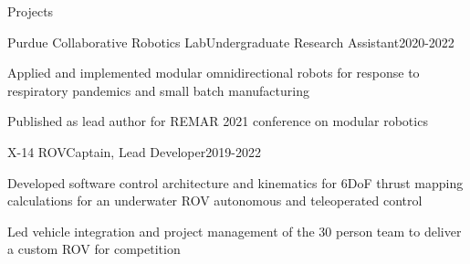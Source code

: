 \documentclass[]{jheidegger-resume}
\begin{document}
\begin{section}{Projects}
\begin{subsection_small}{Purdue Collaborative Robotics Lab}{Undergraduate Research Assistant}{2020-2022}
    \item{Applied and implemented modular omnidirectional robots for response to respiratory pandemics and small batch manufacturing}
    \item {Published as lead author for REMAR 2021 conference on modular robotics}
\end{subsection_small}
\begin{subsection_small}{X-14 ROV}{Captain, Lead Developer}{2019-2022}
    \item{Developed software control architecture and kinematics for 6DoF thrust mapping calculations for an underwater ROV autonomous and teleoperated control}
    \item{Led vehicle integration and project management of the 30 person team to deliver a custom ROV for competition}  
\end{subsection_small}

\end{section}
 {
}




\end{document}
